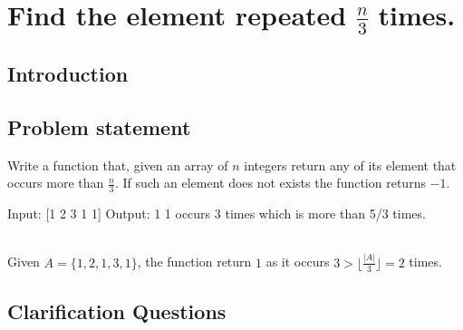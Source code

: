 %



\chapter{Find the element repeated $\frac{n}{3}$ times.}
\label{ch:find_repeated_number_n_divided_3_times}
\section*{Introduction}

\section{Problem statement}
\begin{exercise}
\label{example:find_repeated_number_n_divided_3_times:exercice1}
Write a function that, given an array of $n$ integers
return any of its element that occurs more than  $\frac{n}{3}$.
If such an element does not exists the function returns $-1$.


Input: [1 2 3 1 1]
Output: 1 
1 occurs 3 times which is more than 5/3 times.
	\begin{example}
		\label{example:find_repeated_number_n_divided_3_times:example1}
		\hfill \\
		Given $A=\{1,2,1,3,1\}$, the function return $1$ as it occurs $3 > \Big\lfloor\frac{|A|}{3}\Big\rfloor =2$ times.
	\end{example}

\end{exercise}

\section{Clarification Questions}

